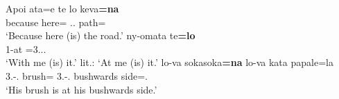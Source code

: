 \pagebreak
\begin{exe}
\ex\label{SavLoc}
\begin{xlist}
\ex\gll Apoi ata=e te lo keva\textbf{=na}\\
because here=\emphat{} \emphat{} \deter.\sg.\mas{} path=\nom{}\\
\glt `Because here (is) the road.'
\ex\gll ny-omata te\textbf{=lo}\\
1\sg{}-at \partic{}=3.\sg{}.\mas{}.\nom{}\\
\glt `With me (is) it.' lit.: `At me (is) it.'
\ex\gll lo-va sokasoka\textbf{=na} lo-va kata papale=la\\
3\sg{}.\mas-\gen.\mas{} brush=\nom{} 3\sg{}.\mas-\gen.\mas{} bushwards side=\loc.\mas{}\\
\glt `His brush is at his bushwards side.'
\end{xlist}
\end{exe}

%

